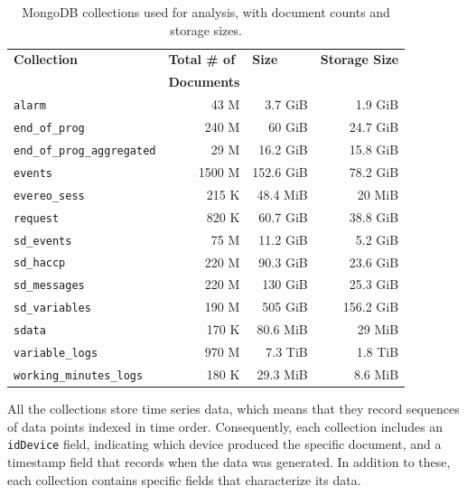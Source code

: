 \begin{table}[h!]
    \centering
    \begin{tabular}{|l|r|r|r|}
    \hline
    \textbf{Collection} & \multicolumn{1}{l|}{\textbf{Total \# of}} & \multicolumn{1}{l|}{\textbf{Size}} & \multicolumn{1}{l|}{\textbf{Storage Size}} \\ 
                        & \multicolumn{1}{l|}{\textbf{Documents}}   &  &          \\ \hline
    \texttt{alarm}                & 43 M    & 3.7 GiB & 1.9 GiB \\ \hline
    \texttt{end\_of\_prog}        & 240 M   & 60 GiB & 24.7 GiB \\ \hline
    \texttt{end\_of\_prog\_aggregated} & 29 M    & 16.2 GiB & 15.8 GiB \\ \hline
    \texttt{events}               & 1500 M  & 152.6 GiB & 78.2 GiB \\ \hline
    \texttt{evereo\_sess}         & 215 K   & 48.4 MiB & 20 MiB \\ \hline
    \texttt{request}              & 820 K   & 60.7 GiB & 38.8 GiB \\ \hline
    \texttt{sd\_events}           & 75 M    & 11.2 GiB & 5.2 GiB \\ \hline
    \texttt{sd\_haccp}            & 220 M   & 90.3 GiB & 23.6 GiB \\ \hline
    \texttt{sd\_messages}         & 220 M   & 130 GiB & 25.3 GiB \\ \hline
    \texttt{sd\_variables}        & 190 M   & 505 GiB & 156.2 GiB \\ \hline
    \texttt{sdata}                & 170 K   & 80.6 MiB & 29 MiB \\ \hline
    \texttt{variable\_logs}       & 970 M   & 7.3 TiB & 1.8 TiB \\ \hline
    \texttt{working\_minutes\_logs} & 180 K  & 29.3 MiB & 8.6 MiB \\ \hline
    \end{tabular}
    \caption{MongoDB collections used for analysis, with document counts and storage sizes.}
\end{table}

All the collections store time series data, which means that they record sequences of data points indexed in time order. Consequently, each collection includes an \texttt{idDevice} field, indicating which device produced the specific document, and a timestamp field that records when the data was generated. In addition to these, each collection contains specific fields that characterize its data.

